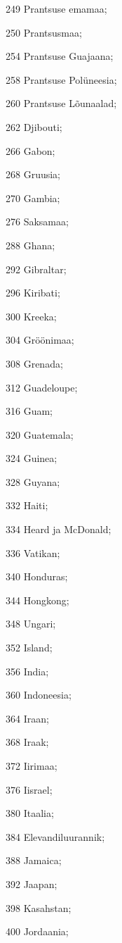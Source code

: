 \documentclass[a4paper]{article}
\begin{document}
\begin{description}
\begin{inparaitem}
    \item[249] Prantsuse emamaa;
    \item[250] Prantsusmaa;
    \item[254] Prantsuse Guajaana;
    \item[258] Prantsuse Polüneesia;
    \item[260] Prantsuse Lõunaalad;
    \item[262] Djibouti;
    \item[266] Gabon;
    \item[268] Gruusia;
    \item[270] Gambia;
    \item[276] Saksamaa;
    \item[288] Ghana;
    \item[292] Gibraltar;
    \item[296] Kiribati;
    \item[300] Kreeka;
    \item[304] Gröönimaa;
    \item[308] Grenada;
    \item[312] Guadeloupe;
    \item[316] Guam;
    \item[320] Guatemala;
    \item[324] Guinea;
    \item[328] Guyana;
    \item[332] Haiti;
    \item[334] Heard ja McDonald;
    \item[336] Vatikan;
    \item[340] Honduras;
    \item[344] Hongkong;
    \item[348] Ungari;
    \item[352] Island;
    \item[356] India;
    \item[360] Indoneesia;
    \item[364] Iraan;
    \item[368] Iraak;
    \item[372] Iirimaa;
    \item[376] Iisrael;
    \item[380] Itaalia;
    \item[384] Elevandiluurannik;
    \item[388] Jamaica;
    \item[392] Jaapan;
    \item[398] Kasahstan;
    \item[400] Jordaania;

\end{inparaitem}
\end{description}
\end{document}
